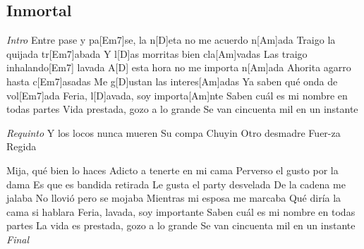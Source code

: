 \subsection{Inmortal}
\noindent

\vspace{1cm}

\begin{guitar}
	\begin{multicols}{2}
		\textit{Intro}
		Entre pase y pa[Em7]se, la n[D]eta no me acuerdo n[Am]ada
		Traigo la quijada tr[Em7]abada
		Y l[D]as morritas bien cla[Am]vadas
		Las traigo inhalando[Em7] lavada
		A[D] esta hora no me importa n[Am]ada
		Ahorita agarro hasta c[Em7]asadas
		Me g[D]ustan las interes[Am]adas
		Ya saben qué onda de vol[Em7]ada
		Feria, l[D]avada, soy importa[Am]nte
	Saben cuál es mi nombre en todas partes
	Vida prestada, gozo a lo grande
	Se van cincuenta mil en un instante
	\par
	\textit{Requinto}
	Y los locos nunca mueren
	Su compa Chuyin
	Otro desmadre
	Fuer-za Regida
	\par
	Mija, qué bien lo haces
	Adicto a tenerte en mi cama
	Perverso el gusto por la dama
	Es que es bandida retirada
	Le gusta el party desvelada
	De la cadena me jalaba
	No llovió pero se mojaba
	Mientras mi esposa me marcaba
	Qué diría la cama si hablara
	Feria, lavada, soy importante
	Saben cuál es mi nombre en todas partes
	La vida es prestada, gozo a lo grande
	Se van cincuenta mil en un instante
		\textit{Final}
	\end{multicols}
\end{guitar}
